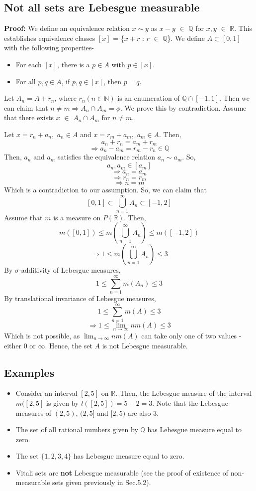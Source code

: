 \documentclass{article}
\begin{document}
\subsection{Not all sets are Lebesgue measurable}


\textbf{Proof: }We define an equivalence relation $x \sim y$ as $x - y$ $\in$ $\mathbb{Q}$ for $x, y$  $\in$ $\mathbb{R}$. This establishes equivalence classes $[x]$ = \{$x + r$ : $r$ $\in$ $\mathbb{Q}$\}. We define $A \subset [0, 1]$ with the following properties-

\begin{itemize}
	\item For each $[x]$, there is a $p \in A$ with $p \in [x]$.
	\item For all $p, q \in A$, if $p, q \in [x]$, then $p = q$.
\end{itemize}

Let $A_n = A + r_n$, where $r_n (n \in \mathbb{N})$ is an enumeration of $\mathbb{Q} \cap [-1,1]$. Then we can claim that $n \neq m \Rightarrow A_n \cap A_m = \phi$. We prove this by contradiction. Assume that there exists $x$ $\in$ $A_n \cap A_m$ for $n \neq m$.

Let $x = r_n + a_n,$ $a_n \in A$ and $x= r_m + a_m,$ $a_m \in A$. Then,
$$a_n + r_n = a_m + r_m$$
$$\Rightarrow a_n - a_m = r_m - r_n \in \mathbb{Q}$$
Then, $a_n$ and $a_m$ satisfies the equivalence relation $a_n \sim a_m$. So,
$$a_n, a_m \in [a_m]$$
$$\Rightarrow a_n = a_m$$
$$\Rightarrow r_n = r_m$$
$$\Rightarrow n = m$$
Which is a contradiction to our assumption. So, we can claim that 
$$[0, 1] \subset \bigcup\limits_{n=1}^\infty A_n \subset [-1, 2]$$
Assume that $m$ is a measure on $P(\mathbb{R})$. Then,
$$m([0, 1]) \leq m(\bigcup\limits_{n=1}^\infty A_n) \leq m([-1, 2])$$
$$\Rightarrow 1 \leq m(\bigcup\limits_{n=1}^\infty A_n) \leq 3 $$
By $\sigma$-additivity of Lebesgue measures,
$$1 \leq \sum\limits_{n=1}^\infty m(A_n) \leq 3$$
By translational invariance of Lebesgue measures,
$$1 \leq \sum\limits_{n=1}^\infty m(A) \leq 3 $$
$$\Rightarrow 1 \leq \lim_{n \rightarrow \infty} n m(A) \leq 3 $$
Which is not possible, as $\lim_{n \rightarrow \infty} n m(A)$ can take only one of two values - either 0 or $\infty$. Hence, the set $A$ is not Lebesgue measurable.

\subsection{Examples}
\begin{itemize}
	\item Consider an interval $[2, 5]$ on $\mathbb{R}$. Then, the Lebesgue measure of the interval $m([2, 5]$ is given by $l([2, 5]) = 5 - 2 = 3$. Note that the Lebesgue measures of $(2, 5)$, $(2, 5]$ and $[2, 5)$ are also 3.
	\item The set of all rational numbers given by $\mathbb{Q}$ has Lebesgue measure equal to zero.
	\item The set $\{1, 2, 3, 4\}$ has Lebesgue measure equal to zero.
	\item Vitali sets are \textbf{not} Lebesgue measurable (see the proof of existence of non-measurable sets given previously in Sec.5.2).
\end{itemize}
\end{document}
